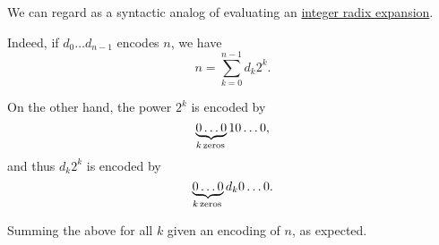 \begin{example}\label{ex:thm:disjoint_sum_via_bitwise_xor}
  We can regard  as a syntactic analog of evaluating an \hyperref[def:nonnegative_integer_radix_expansion]{integer radix expansion}.

  Indeed, if \( d_0 \ldots d_{n-1} \) encodes \( n \), we have
  \begin{equation*}
    n = \sum_{k=0}^{n-1} d_k 2^k.
  \end{equation*}

  On the other hand, the power \( 2^k \) is encoded by
  \begin{equation*}
    \underbrace{0 \ldots 0}_{k \T*{zeros}} 1 0 \ldots 0,
  \end{equation*}
  and thus \( d_k 2^k \) is encoded by
  \begin{equation*}
    \underbrace{0 \ldots 0}_{k \T*{zeros}} d_k 0 \ldots 0.
  \end{equation*}

  Summing the above for all \( k \) given an encoding of \( n \), as expected.
\end{example}
